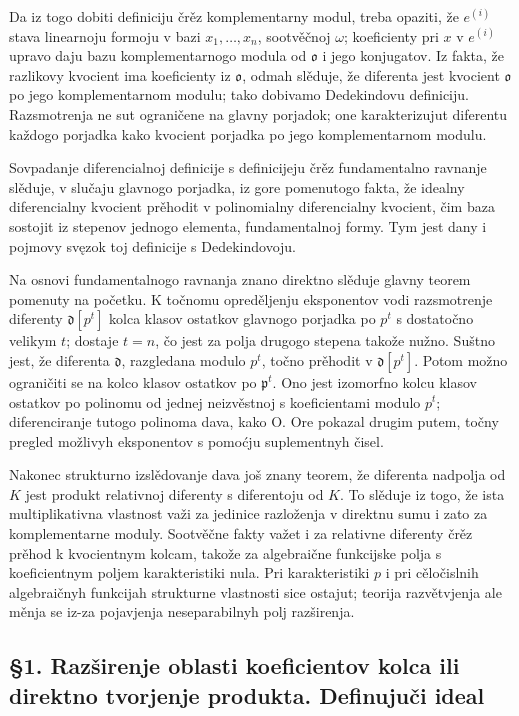 \documentclass[11pt]{article}
\begin{document}
Da iz togo dobiti definiciju črěz komplementarny modul, treba opaziti, že \(e^{(i)}\) stava linearnoju formoju v bazi \(x_1,\ldots,x_n\), sootvěčnoj \(\omega\); koeficienty pri \(x\) v \(e^{(i)}\) upravo daju bazu komplementarnogo modula od \(\mathfrak o\) i jego konjugatov. Iz fakta, že razlikovy kvocient ima koeficienty iz \(\mathfrak o\), odmah slěduje, že diferenta jest kvocient \(\mathfrak o\) po jego komplementarnom modulu; tako dobivamo Dedekindovu definiciju. Razsmotrenja ne sut ograničene na glavny porjadok; one karakterizujut diferentu každogo porjadka kako kvocient porjadka po jego komplementarnom modulu.

Sovpadanje diferencialnoj definicije s definicijeju črěz fundamentalno ravnanje slěduje, v slučaju glavnogo porjadka, iz gore pomenutogo fakta, že idealny diferencialny kvocient prěhodit v polinomialny diferencialny kvocient, čim baza sostojit iz stepenov jednogo elementa, fundamentalnoj formy. Tym jest dany i pojmovy svęzok toj definicije s Dedekindovoju.

Na osnovi fundamentalnogo ravnanja znano direktno slěduje glavny teorem pomenuty na početku. K točnomu opreděljenju eksponentov vodi razsmotrenje diferenty \(\mathfrak d[p^t]\) kolca klasov ostatkov glavnogo porjadka po \(p^t\) s dostatočno velikym \(t\); dostaje \(t=n\), čo jest za polja drugogo stepena takože nužno. Suštno jest, že diferenta \(\mathfrak d\), razgledana modulo \(p^t\), točno prěhodit v \(\mathfrak d[p^t]\). Potom možno ograničiti se na kolco klasov ostatkov po \(\mathfrak p^t\). Ono jest izomorfno kolcu klasov ostatkov po polinomu od jednej neizvěstnoj s koeficientami modulo \(p^t\); diferenciranje tutogo polinoma dava, kako O. Ore pokazal drugim putem, točny pregled možlivyh eksponentov s pomoćju suplementnyh čisel.

Nakonec strukturno izslědovanje dava još znany teorem, že diferenta nadpolja od \(K\) jest produkt relativnoj diferenty s diferentoju od \(K\). To slěduje iz togo, že ista multiplikativna vlastnost važi za jedinice razloženja v direktnu sumu i zato za komplementarne moduly. Sootvěčne fakty važet i za relativne diferenty črěz prěhod k kvocientnym kolcam, takože za algebraične funkcijske polja s koeficientnym poljem karakteristiki nula. Pri karakteristiki \(p\) i pri cěločislnih algebraičnyh funkcijah strukturne vlastnosti sice ostajut; teorija razvětvjenja ale měnja se iz-za pojavjenja neseparabilnyh polj razširenja.

\subsection*{§1. Razširenje oblasti koeficientov kolca ili direktno tvorjenje produkta. Definujuči ideal}
\end{document}
